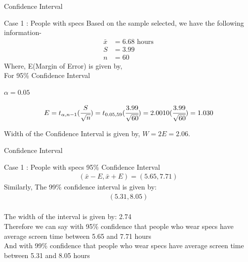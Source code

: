 \documentclass{beamer}
\begin{document}
\begin{frame}{Confidence Interval}
\begin{block}{Case 1 : People with specs}
Based on the sample selected, we have the following information-
\begin{align}
    \bar{x} &= 6.68 \text{ hours}\\ 
    S &= 3.99\\
    n &= 60
\end{align}
Where, E(Margin of Error) is given by,
\\For 95\% Confidence Interval
\begin{center}
    $\alpha = 0.05$
\end{center}
\begin{align}
    E =t_{{\alpha}, n-1}(\cfrac{S}{\sqrt{n}})=t_{{0.05}, 59}(\cfrac{3.99}{\sqrt{60}})=2.0010(\cfrac{3.99}{\sqrt{60}})=1.030
\end{align}

 Width of the Confidence Interval is given by, $W = 2E= 2.06$.
\end{block}
\end{frame}
\begin{frame}{Confidence Interval}
\begin{block}{Case 1 : People with specs}
95\% Confidence Interval
 \begin{align}
      (\bar{x} - E,\bar{x} + E) = (5.65,7.71)
 \end{align}
 Similarly, The 99\% confidence interval is given by: 
 \begin{align}(5.31,8.05)\end{align} \\The width of the interval is given by: 2.74
 \newline
\\Therefore we can say with 95\% confidence that people who wear specs have average screen time between 5.65 and 7.71 hours
 \newline
\\And with 99\% confidence that people who wear specs have average screen time between 5.31 and 8.05 hours
\end{block}
\end{frame}
\end{document}
